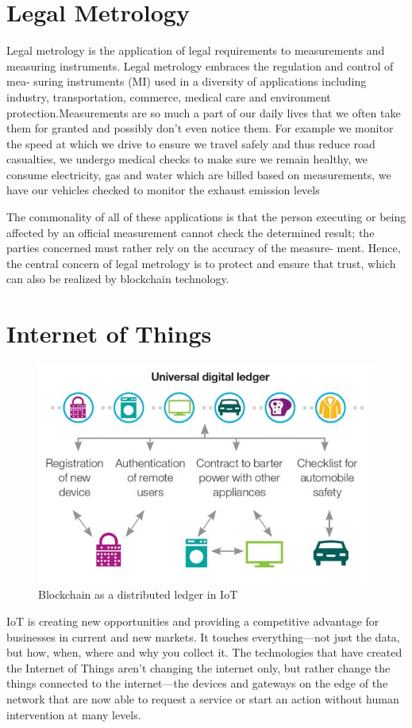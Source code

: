 \documentclass[12pt]{report}
\begin{document}
\section{Legal Metrology}
\par Legal metrology is the application of legal requirements to measurements and measuring instruments. Legal metrology embraces the regulation and control of mea-
suring instruments (MI) used in a diversity of applications
including industry, transportation, commerce, medical care
and environment protection.Measurements are so much a part of our daily lives that we often take them for granted and possibly don’t even notice them. For example we monitor the speed at which we drive to ensure we travel safely and thus reduce road casualties, we undergo medical checks to make sure we remain healthy, we consume electricity, gas and water which are billed based on measurements, we have our vehicles checked to monitor the exhaust emission levels
\par The commonality of all of these applications is
that the person executing or being affected by an official
measurement cannot check the determined result; the parties
concerned must rather rely on the accuracy of the measure-
ment. Hence, the central concern of legal metrology is to
protect and ensure that trust, which can also be realized by
blockchain technology.
\section{Internet of Things}
\begin{figure}
    \centering
    \includegraphics[width=.5\textwidth]{iot.jpg}
    \caption{Blockchain as a distributed ledger in IoT}
    \label{fig:my_label}
\end{figure}

\par IoT is creating new opportunities and providing a competitive advantage for businesses in current and new markets. It touches everything—not just the data, but how, when, where and why you collect it. The technologies that have created the Internet of Things aren’t changing the internet only, but rather change the things connected to the internet—the devices and gateways on the edge of the network that are now able to request a service or start an action without human intervention at many levels.
\end{document}
